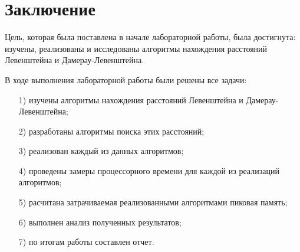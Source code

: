 \chapter*{Заключение}
Цель, которая была поставлена в начале лабораторной работы, была достигнута: изучены, реализованы и исследованы
алгоритмы нахождения расстояний Левенштейна и Дамерау-Левенштейна.

В ходе выполнения лабораторной работы были решены все задачи:
\begin{enumerate}
	\item[1)] изучены алгоритмы нахождения расстояний Левенштейна и Дамерау-Левенштейна;
	\item[2)] разработаны алгоритмы поиска этих расстояний;
	\item[3)] реализован каждый из данных алгоритмов;
	\item[4)] проведены замеры процессорного времени для каждой из реализаций алгоритмов;
	\item[5)] расчитана затрачиваемая реализованными алгоритмами пиковая память;
	\item[6)] выполнен анализ полученных результатов;
	\item[7)] по итогам работы составлен отчет.
\end{enumerate}



